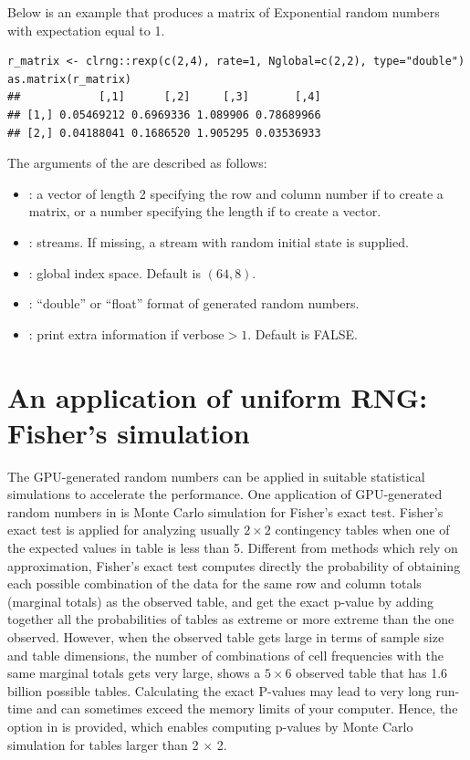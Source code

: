\documentclass[article,nojss]{jss}\usepackage[]{graphicx}\usepackage[]{color}
\makeatletter
\newenvironment{kframe}{%
 \def\at@end@of@kframe{}%
 \ifinner\ifhmode%
  \def\at@end@of@kframe{\end{minipage}}%
  \begin{minipage}{\columnwidth}%
 \fi\fi%
 \def\FrameCommand##1{\hskip\@totalleftmargin \hskip-\fboxsep
 \colorbox{shadecolor}{##1}\hskip-\fboxsep
     \hskip-\linewidth \hskip-\@totalleftmargin \hskip\columnwidth}%
 \MakeFramed {\advance\hsize-\width
   \@totalleftmargin\z@ \linewidth\hsize
   \@setminipage}}%
 {\par\unskip\endMakeFramed%
 \at@end@of@kframe}
\newenvironment{knitrout}{}{} %
\newcommand{\fct}[1]{\code{#1()}}
\makeatother
\begin{document}
Below is an example that produces a matrix of Exponential random numbers with expectation equal to 1.
\begin{knitrout}
\color{fgcolor}\begin{kframe}
\begin{verbatim}
r_matrix <- clrng::rexp(c(2,4), rate=1, Nglobal=c(2,2), type="double")
as.matrix(r_matrix)
##            [,1]      [,2]     [,3]       [,4]
## [1,] 0.05469212 0.6969336 1.089906 0.78689966
## [2,] 0.04188041 0.1686520 1.905295 0.03536933
\end{verbatim}
\end{kframe}
\end{knitrout}
The arguments of the \fct{clrng::rexp} are described as follows:
\begin{itemize}
\itemsep0em 
  \item {}: a vector of length 2 specifying the row and column number if to create a matrix, or a number specifying the length if to create a vector.
  \item {}: streams. If missing, a stream with random initial state is supplied.
  \item {}: global index space. Default is $(64,8)$.
  \item {}: ``double'' or ``float'' format of generated random numbers.
  \item {}: print extra information if $\text{verbose} > 1$. Default is FALSE.
\end{itemize}





\section{An application of uniform RNG: Fisher's simulation}
The GPU-generated random numbers can be applied in suitable statistical simulations to accelerate the performance.
One application of GPU-generated random numbers in  is Monte Carlo simulation for Fisher's exact test. Fisher’s exact test is applied for analyzing usually $2 \times 2$ contingency tables when one of the expected values in table is less than 5. Different from methods which rely on approximation, Fisher's exact test computes directly the probability of obtaining each possible combination of the data for the same row and column totals (marginal totals) as the observed table, and get the exact p-value by adding together all the probabilities of tables as extreme or more extreme than the one observed. However, when the observed table gets large in terms of sample size and table dimensions, the number of combinations of cell frequencies with the same marginal totals gets very large, \cite[][p. 23]{mehta2011ibm} shows a $5 \times 6$ observed table that has 1.6 billion possible tables. Calculating the exact P-values may lead to very long run-time and can sometimes exceed the memory limits of your computer. Hence, the option  in \fct{stats::fisher.test} is provided, which enables computing p-values by Monte Carlo simulation for tables larger than 2 $\times$ 2. 
\end{document}
